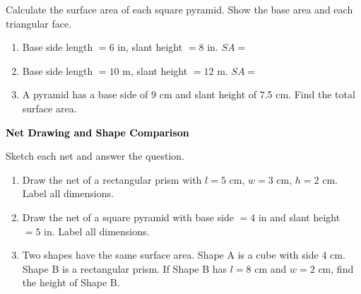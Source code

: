 \documentclass[12pt, letterpaper, fleqn]{article}
\newcommand{\blank}{\underline{\hspace{2.2cm}}}
\begin{document}
\noindent
Calculate the surface area of each square pyramid. Show the base area and each triangular face.

\vspace{3mm}

\begin{enumerate}[itemsep=3cm, leftmargin=0.6cm]

\item Base side length $= 6\text{ in}$, slant height $= 8\text{ in}$. \quad $SA =$ \blank

\vspace{2cm}

\item Base side length $= 10\text{ m}$, slant height $= 12\text{ m}$. \quad $SA =$ \blank

\vspace{2cm}

\item A pyramid has a base side of 9 cm and slant height of 7.5 cm. Find the total surface area.

\vspace{2cm}

\end{enumerate}

\newpage

\begin{tcolorbox}[colback=black!10]
\large\textcolor{black}{\textbf{Net Drawing and Shape Comparison}}
\end{tcolorbox}

\noindent
Sketch each net and answer the question.

\vspace{3mm}

\begin{enumerate}[itemsep=2.3cm, leftmargin=0.6cm]

\item Draw the net of a rectangular prism with $l = 5\text{ cm}$, $w = 3\text{ cm}$, $h = 2\text{ cm}$. Label all dimensions.

\vspace{2.5cm}

\item Draw the net of a square pyramid with base side $= 4\text{ in}$ and slant height $= 5\text{ in}$. Label all dimensions.

\vspace{2.5cm}

\item Two shapes have the same surface area. Shape A is a cube with side 4 cm. Shape B is a rectangular prism. If Shape B has $l = 8\text{ cm}$ and $w = 2\text{ cm}$, find the height of Shape B.

\vspace{2cm}

\end{enumerate}
\end{document}
